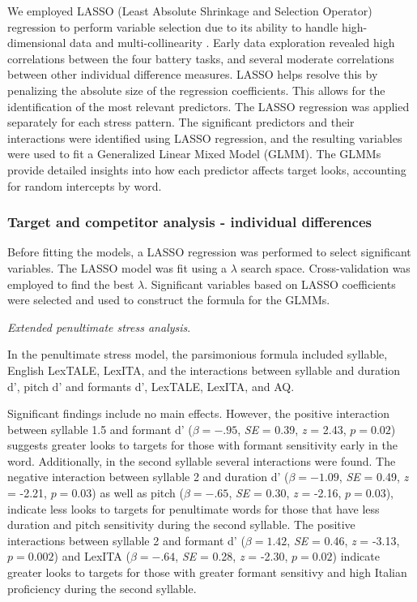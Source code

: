 We employed LASSO (Least Absolute Shrinkage and Selection Operator) regression to perform variable selection due to its ability to handle high-dimensional data and multi-collinearity \citep{Zhang2020, Tibshirani1996}. Early data exploration revealed high correlations between the four battery tasks, and several moderate correlations between other individual difference measures. LASSO helps resolve this by penalizing the absolute size of the regression coefficients. This allows for the identification of the most relevant predictors. The LASSO regression was applied separately for each stress pattern. The significant predictors and their interactions were identified using LASSO regression, and the resulting variables were used to fit a Generalized Linear Mixed Model (GLMM). The GLMMs provide detailed insights into how each predictor affects target looks, accounting for random intercepts by word.


\subsubsection{Target and competitor analysis - individual differences}

Before fitting the models, a LASSO regression was performed to select significant variables. The LASSO model was fit using a $\lambda$ search space. Cross-validation was employed to find the best $\lambda$. Significant variables based on LASSO coefficients were selected and used to construct the formula for the GLMMs.

\textit{Extended penultimate stress analysis}. 

In the penultimate stress model, the parsimonious formula included syllable, English LexTALE, LexITA, and the interactions between syllable and duration d', pitch d' and formants d', LexTALE, LexITA, and AQ. 

Significant findings include no main effects. However, the positive interaction between syllable 1.5 and formant d' ($\beta= -.95$, \textit{SE} = 0.39, \textit{z} = 2.43, $p = 0.02$) suggests greater looks to targets for those with formant sensitivity early in the word. Additionally, in the second syllable several interactions were found. The negative interaction between syllable 2 and duration d' ($\beta= -1.09$, \textit{SE} = 0.49, \textit{z} = -2.21, $p = 0.03$) as well as pitch ($\beta= -.65$, \textit{SE} = 0.30, \textit{z} = -2.16, $p = 0.03$), indicate less looks to targets for penultimate words for those that have less duration and pitch sensitivity during the second syllable. The positive interactions between syllable 2 and formant d' ($\beta= 1.42$, \textit{SE} = 0.46, \textit{z} = -3.13, $p = 0.002$) and LexITA ($\beta= -.64$, \textit{SE} = 0.28, \textit{z} = -2.30, $p = 0.02$) indicate greater looks to targets for those with greater formant sensitivy and high Italian proficiency during the second syllable.


